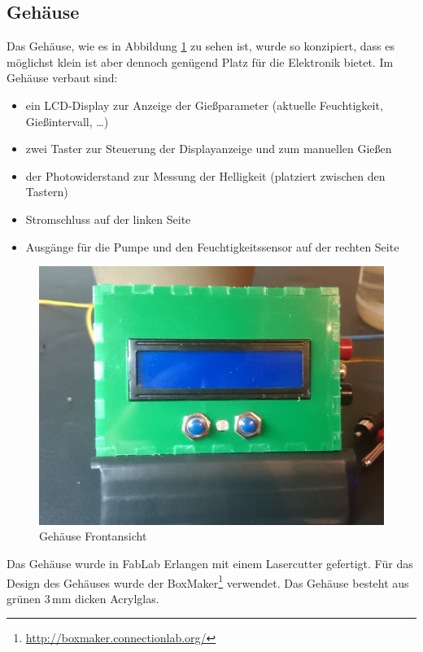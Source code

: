 	

\subsection{Gehäuse}
	Das Gehäuse, wie es in Abbildung \ref{fig-Gehäuse} zu sehen ist, wurde so konzipiert, dass es möglichst klein ist aber dennoch genügend Platz für die Elektronik bietet.
	Im Gehäuse verbaut sind:
\begin{itemize}
	\item ein LCD-Display zur Anzeige der Gießparameter (aktuelle Feuchtigkeit, Gießintervall, \dots)
	\item zwei Taster zur Steuerung der Displayanzeige und zum manuellen Gießen
	\item der Photowiderstand zur Messung der Helligkeit (platziert zwischen den Tastern)
	\item Stromschluss auf der linken Seite
	\item Ausgänge für die Pumpe und den Feuchtigkeitssensor auf der rechten Seite

\end{itemize}	

	\begin{figure}[!h]
	\centering
	\includegraphics[width=0.9\linewidth]{bilder/_boxFron1.jpg}	
	\caption{Gehäuse Frontansicht}
	\label{fig-Gehäuse}
	\end{figure}
	
Das Gehäuse wurde in FabLab Erlangen mit einem Lasercutter gefertigt. 
Für das Design des Gehäuses wurde der BoxMaker\footnote{ \href{http://boxmaker.connectionlab.org/}{http://boxmaker.connectionlab.org/}} verwendet. 
Das Gehäuse besteht aus grünen 3\,mm dicken Acrylglas.
	
